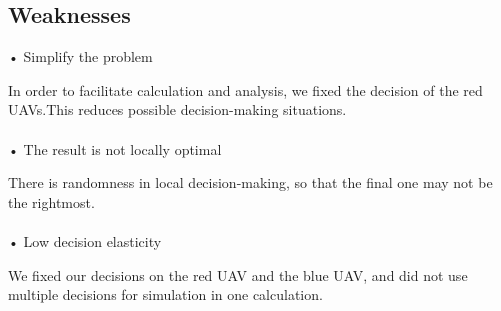 \documentclass{mcmthesis}
\begin{document}
\subsection{Weaknesses}

• Simplify the problem \par
	In order to facilitate calculation and analysis, we fixed the decision of the red UAVs.This reduces possible decision-making situations. \\ \\
• The result is not locally optimal \par
	There is randomness in local decision-making, so that the final one may not be the rightmost.\\ \\
• Low decision elasticity \par
	We fixed our decisions on the red UAV and the blue UAV, and did not use multiple decisions for simulation in one calculation. \\
\end{document}
